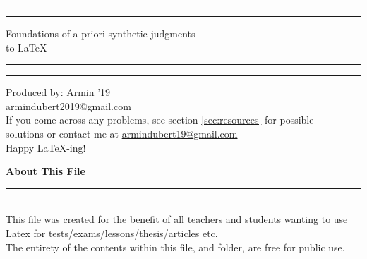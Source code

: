 \documentclass[12pt,hidelinks]{article}
\begin{document}
\begin{titlepage}
	\centering %
	\scshape %
	\vspace*{1.5\baselineskip} %

	\rule{13cm}{1.6pt}\vspace*{-\baselineskip}\vspace*{2pt} %
	\rule{13cm}{0.4pt} %
	
		\vspace{0.75\baselineskip} %
	{	\Huge Foundations of a priori synthetic judgments\\ 
			\vspace{4mm}
		to \LaTeX \\	}
		\vspace{0.75\baselineskip} %
	\rule{13cm}{0.4pt}\vspace*{-\baselineskip}\vspace{3.2pt} %
	\rule{13cm}{1.6pt} %
	
		\vspace{1.75\baselineskip} %
	{\large Produced by: Armin '19 \\
		\vspace*{1.2\baselineskip}
	armindubert2019@gmail.com} \\
	\vfill
If you come across any problems, see section \ref{sec:resources} for possible\\ \vspace{1mm}
solutions or contact me at \url{armindubert19@gmail.com}\\ \vspace{1mm}
Happy \LaTeX-ing!
\end{titlepage}
\tableofcontents
\vfill
\small{\noindent \textbf{About This File} \vspace{-3mm}\\
\noindent \rule{3.3cm}{0.5pt} \\
This file was created for the benefit of all teachers and students wanting to use Latex for tests/exams/lessons/thesis/articles etc.\\
The entirety of the contents within this file, and folder, are free for public use.}
\newpage
{}

\end{document}
